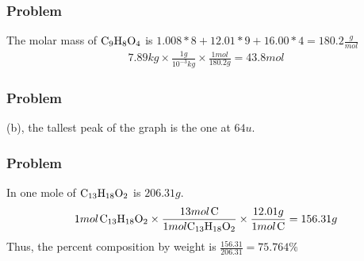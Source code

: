 \documentclass{article}
\begin{document}
\subsubsection*{Problem \countThis}
The molar mass of \(\ce{C_9H_8O_4}\) is \(1.008*8 + 12.01*9 + 16.00*4 = 180.2 \frac{g}{mol}\)
\begin{equation}
\begin{aligned}
    7.89kg \times \frac{1g}{10^{-3}kg} \times \frac{1mol}{180.2g} = 43.8mol
\end{aligned}
\end{equation}
\subsubsection*{Problem \countThis}
(b), the tallest peak of the graph is the one at \(64u\). 
\subsubsection*{Problem \countThis}
In one mole of \(\ce{C_{13}H_{18}O_2}\) is \(206.31g\).
\begin{equation}
\begin{aligned}
    1mol\hspace{0.1em}\ce{C_{13}H_{18}O_2} \times \frac{13mol\hspace{0.1em}\ce{C}}{1mol\ce{C_{13}H_{18}O_2}} \times \frac{12.01g}{1mol\hspace{0.1em}\ce{C}} = 156.31g
\end{aligned}
\end{equation}
Thus, the percent composition by weight is \(\frac{156.31}{206.31} = 75.764\%\)
\end{document}
